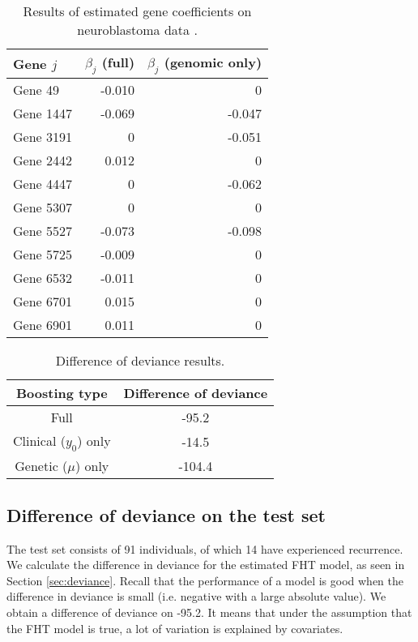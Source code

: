 \begin{table}
\caption{Results of estimated gene coefficients on neuroblastoma data \citep{oberthuer-data}.}
\label{tab:oberthuer-beta}
\centering
\begin{tabular}{lrr}
\toprule
Gene $j$      & $\beta_j$ (full) & $\beta_j$ (genomic only)\\
\hline
Gene 49   & -0.010  &      0  \\
Gene 1447 & -0.069  & -0.047  \\
Gene 3191 &      0  & -0.051  \\
Gene 2442 &  0.012  &      0  \\
Gene 4447 &      0  & -0.062  \\
Gene 5307 &      0  &      0  \\
Gene 5527 & -0.073  & -0.098  \\
Gene 5725 & -0.009  &      0  \\
Gene 6532 & -0.011  &      0  \\
Gene 6701 &  0.015  &      0  \\
Gene 6901 &  0.011  &      0  \\
\bottomrule
\end{tabular}
\end{table}

\begin{table}
\caption{Difference of deviance results.}
\label{tab:deviances}
\centering
\begin{tabular}{cc}
\toprule
Boosting type & Difference of deviance \\
\hline
Full & -95.2 \\
Clinical ($y_0$) only  & -14.5 \\
Genetic ($\mu$) only & -104.4 \\
\bottomrule
\end{tabular}
\end{table}

\subsection{Difference of deviance on the test set}
The test set consists of 91 individuals, of which 14 have experienced recurrence.
We calculate the difference in deviance for the estimated FHT model, as seen in Section \ref{sec:deviance}.
Recall that the performance of a model is good when the difference in deviance is small (i.e. negative with a large absolute value).
We obtain a difference of deviance on -95.2.
It means that under the assumption that the FHT model is true, a lot of variation is explained by covariates.

